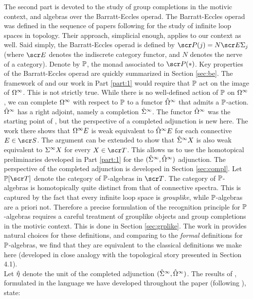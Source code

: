 \documentclass{amsart}
\theoremstyle{definition}
\begin{document}
The second part is devoted to the study of group completions in the motivic context, and algebras over the Barratt-Eccles operad. The Barratt-Eccles operad was defined in the sequence of papers following \cite{Barratt1974oper} for the study of infinite loop spaces in topology. Their approach, simplicial enough, applies to our context as well. Said simply, the Barratt-Eccles operad is defined by $\sP(j) = N \sE \SI_j$ (where $\sE$ denotes the indiscrete category functor, and $N$ denotes the nerve of a category). Denote by $\mathbb{P}$, the monad associated to $\sP(*)$. Key properties of the Barratt-Eccles operad are quickly summarized in Section \ref{sec:be}. The framework of \cite{kong2024group} and our work in Part \ref{part:1} would require that $\mathbb{P}$ act on the image of $\Omega^{\infty}$. This is not strictly true. While there is no well-defined action of $\mathbb{P}$ on $\Omega^{\infty}$, we can complete $\Omega^{\infty}$ with respect to $\mathbb{P}$ to a functor $\hat{\Omega}^{\infty}$ that admits a $\mathbb{P}$-action. $\hat{\Omega}^{\infty}$ has a right adjoint, namely a completion $\hat{\Sigma}^{\infty}$. The functor $\hat{\Omega}^{\infty}$ was the starting point of \cite{Barratt1974oper2}, but the perspective of a completed adjunction is new here. The work there shows that $\Omega^{\infty}E$ is weak equivalent to $\hat{\Omega}^{\infty}E$ for each connective $E \in \sS$. The argument can be extended to show that $\hat{\Sigma}^{\infty}X$ is also weak equivalent to $\Sigma^{\infty}X$ for every $X \in \sT$. This allows us to use the homotopical preliminaries developed in Part \ref{part:1} for the $(\hat{\Sigma}^{\infty},\hat{\Omega}^{\infty})$ adjunction. The perspective of the completed adjunction is developed in Section \ref{sec:compl}. Let $\bP[\sT]$ denote the category of $\mathbb{P}$-algebras in $\sT$. The category of $\mathbb{P}$-algebras is homotopically quite distinct from that of connective spectra. This is captured by the fact that every infinite loop space is \emph{grouplike}, while $\mathbb{P}$-algebras are a priori not. Therefore a precise formulation of the recognition principle for $\mathbb{P}$-algebras requires a careful treatment of grouplike objects and group completions in the motivic context. This is done in Section \ref{sec:grplike}. The work in \cite{Barratt1974oper} provides natural choices for these definitions, and comparing to the \emph{formal} definitions for $\mathbb{P}$-algebras, we find that they are equivalent to the classical definitions we make here (developed in close analogy with the topological story presented in Section 4.1). \\

Let $\hat{\eta}$ denote the unit of the completed adjunction $(\hat{\Sigma}^{\infty},\hat{\Omega}^{\infty})$. The results of \cite{Barratt1974oper2}, formulated in the language we have developed throughout the paper (following \cite{kong2024group}), state:
\end{document}
